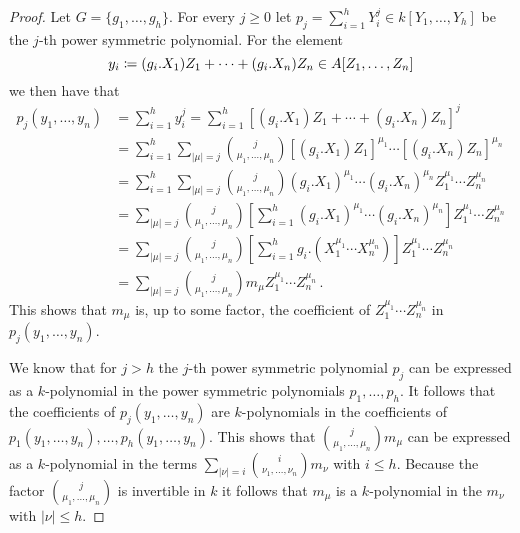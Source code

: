 \begin{proof}
  Let $G = \{g_1, \dotsc, g_h\}$.
  For every $j \geq 0$ let $p_j = \sum_{i=1}^h Y_i^j \in k[Y_1, \dotsc, Y_h]$ be the $j$-th power symmetric polynomial.
  For the element
  \[
              y_i
    \coloneqq  (g_i.X_1) Z_1 + \dotsb + (g_i.X_n) Z_n
    \in       A[Z_1, \dotsc, Z_n]
  \]
  we then have that
  \begin{align*}
        p_j(y_1, \dotsc, y_n)
    &=  \sum_{i=1}^h y_i^j
     =  \sum_{i=1}^h \left[ (g_i.X_1) Z_1 + \dotsb + (g_i.X_n) Z_n \right]^j  \\
    &=  \sum_{i=1}^h \sum_{|\mu| = j}
        \binom{j}{\mu_1, \dotsc, \mu_n} [(g_i.X_1) Z_1]^{\mu_1} \dotsm [(g_i.X_n) Z_n]^{\mu_n}  \\
    &=  \sum_{i=1}^h \sum_{|\mu| = j}
        \binom{j}{\mu_1, \dotsc, \mu_n} (g_i.X_1)^{\mu_1} \dotsm (g_i.X_n)^{\mu_n} Z_1^{\mu_1} \dotsm Z_n^{\mu_n} \\
    &=  \sum_{|\mu| = j} \binom{j}{\mu_1, \dotsc, \mu_n}
        \left[
          \sum_{i=1}^h (g_i.X_1)^{\mu_1} \dotsm (g_i.X_n)^{\mu_n}
        \right]
        Z_1^{\mu_1} \dotsm Z_n^{\mu_n}  \\
    &=  \sum_{|\mu| = j} \binom{j}{\mu_1, \dotsc, \mu_n}
        \left[
          \sum_{i=1}^h g_i.(X_1^{\mu_1} \dotsm X_n^{\mu_n})
        \right]
        Z_1^{\mu_1} \dotsm Z_n^{\mu_n}  \\
    &=  \sum_{|\mu| = j} \binom{j}{\mu_1, \dotsc, \mu_n} m_\mu Z_1^{\mu_1} \dotsm Z_n^{\mu_n} \,.
  \end{align*}
  This shows that $m_\mu$ is, up to some factor, the coefficient of $Z_1^{\mu_1} \dotsm Z_n^{\mu_n}$ in $p_j(y_1, \dotsc, y_n)$.
  
  We know that for $j > h$ the $j$-th power symmetric polynomial $p_j$ can be expressed as a $k$-polynomial in the power symmetric polynomials $p_1, \dotsc, p_h$.
  It follows that the coefficients of $p_j(y_1, \dotsc, y_n)$ are $k$-polynomials in the coefficients of $p_1(y_1, \dotsc, y_n), \dotsc, p_h(y_1, \dotsc, y_n)$.
  This shows that $\binom{j}{\mu_1, \dotsc, \mu_n} m_\mu$ can be expressed as a $k$-polynomial in the terms $\sum_{|\nu| = i} \binom{i}{\nu_1, \dotsc, \nu_n} m_\nu$ with $i \leq h$.
  Because the factor $\binom{j}{\mu_1, \dotsc, \mu_n}$ is invertible in $k$ it follows that $m_\mu$ is a $k$-polynomial in the $m_\nu$ with $|\nu| \leq h$.
\end{proof}



